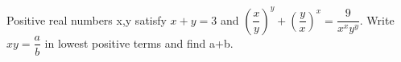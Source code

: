 Positive real numbers x,y satisfy $x+y=3$ and $\left(\dfrac{x}{y}\right)^y+\left(\dfrac{y}{x}\right)^x=\dfrac{9}{x^xy^y}$. Write $xy=\dfrac{a}{b}$ in lowest positive terms and find a+b.
